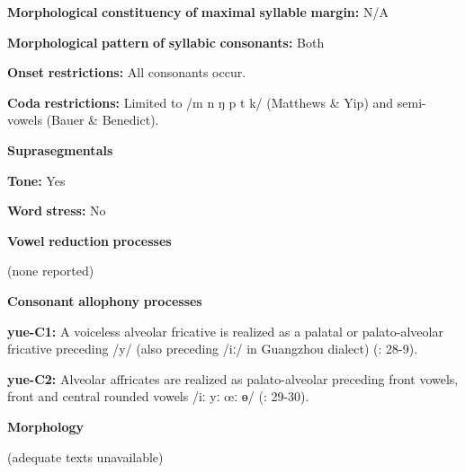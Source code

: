 \textbf{Morphological} \textbf{constituency} \textbf{of} \textbf{maximal} \textbf{syllable} \textbf{margin:} N/A

\textbf{Morphological} \textbf{pattern} \textbf{of} \textbf{syllabic} \textbf{consonants:} Both

\textbf{Onset} \textbf{restrictions:} All consonants occur.

\textbf{Coda} \textbf{restrictions:} Limited to /m n ŋ p t k/ (Matthews \& Yip) and semi-vowels (Bauer \& Benedict).

\textbf{Suprasegmentals}

\textbf{Tone:} Yes

\textbf{Word} \textbf{stress:} No

\textbf{Vowel} \textbf{reduction} \textbf{processes}

(none reported)

\textbf{Consonant} \textbf{allophony} \textbf{processes}

\textbf{yue-C1:} A voiceless alveolar fricative is realized as a palatal or palato-alveolar fricative preceding /y/ (also preceding /iː/ in Guangzhou dialect) (\citealt{BauerBenedict1997}: 28-9).

\textbf{yue-C2:} Alveolar affricates are realized as palato-alveolar preceding front vowels, front and central rounded vowels /iː yː œː ɵ/ (\citealt{BauerBenedict1997}: 29-30).

\textbf{Morphology}

(adequate texts unavailable) 
